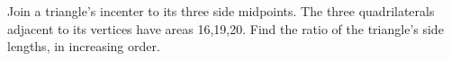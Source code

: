 Join a triangle's incenter to its three side midpoints. The three quadrilaterals adjacent to its vertices have areas 16,19,20. Find the ratio of the triangle's side lengths, in increasing order.
